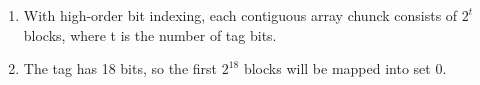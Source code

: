 \documentclass{article}
\begin{document}
\begin{enumerate}[label=\textbf{\Alph*.}]
	\item With high-order bit indexing, each contiguous array
	chunck consists of $2^t$ blocks, where t is the number of
	tag bits.
	\item The tag has 18 bits, so the first $2^18$ blocks will
	be mapped into set 0.
\end{enumerate}
\end{document}
